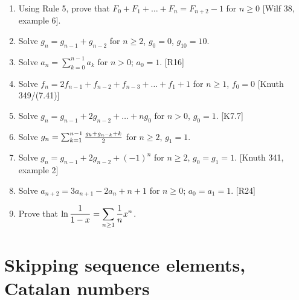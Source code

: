 \documentclass[10pt, a4paper]{article}
\newcommand*\ruleline[1]{\par\noindent\raisebox{.8ex}{\makebox[\linewidth]{\hrulefill\hspace{1ex}\raisebox{-.8ex}{#1}\hspace{1ex}\hrulefill}}}
\def\ans#1{\big[\hskip 2mm {#1}\hskip 2mm\big]}
\begin{document}
\ruleline{Exercises}

\begin{enumerate}
    \item Using Rule 5, prove that $F_0+F_1+\dots+F_n=F_{n+2}-1$ for $n\ge 0$ [Wilf 38, example 6].\\
        \ans{Compare gfs of both sides, left is $f/(1-x)$, where $f = x/(1-x-x^2)$, i.e. Fibonacci.}
    \item Solve $g_n=g_{n-1}+g_{n-2}$ for $n\ge 2$, $g_0 = 0$, $g_{10} = 10$.\\
        \ans{$g_n = {g_{10}\over F_{10}}F_n$, try the ``boundary method'' described above, computer necessary}
    \item Solve $a_n = \sum_{k=0}^{n-1}a_k$ for $n > 0$; $a_0 = 1$. [R16]\\
        \ans{$a_n = 2^{n-1}$ for $n \ge 1$}
    \item Solve $f_n=2f_{n-1}+f_{n-2}+f_{n-3}+\dots+f_1+1$ for $n\ge 1$, $f_0 = 0$ [Knuth 349/(7.41)]\\
        \ans{$F(x) = x/(1-3x+x^2)$; $f_n=F_{2n}$}
    \item Solve $g_n = g_{n-1} + 2g_{n-2}+\dots +ng_0$ for $n> 0$, $g_0 = 1$. [K7.7]\\
        \ans{$G(x)=1+x/(1-3x+x^2)$; $g_n=F_{2n} + [n=0]$}
    \item Solve $g_n = \sum_{k=1}^{n-1} {g_k + g_{n-k} + k\over 2}$ for $n\ge 2$, $g_1 = 1$.
    \item Solve $g_n=g_{n-1}+2g_{n-2}+(-1)^n$ for $n\ge 2$, $g_0 = g_1 = 1$. [Knuth 341, example 2]\\
        \ans{$G(x) = {1+x+x^2\over (1-2x)(1+x)^2}$; $g_n = {7\over 9}2^n + {1\over 9}(3n+2)(-1)^n$}
    \item Solve $a_{n+2}=3a_{n+1}-2a_n+n+1$ for $n\ge 0$; $a_0 = a_1 = 1$. [R24]\\
        \ans{$A(z) = {2\over 1-2z}-{1\over (1-z)^3}$; $a_n = 2^{n+1}-{n+2\choose 2}$}
    \item Prove that $\displaystyle \ln {1\over 1-x} = \sum_{n\ge 1} {1\over n} x^n$. \ans{consider $\int {1\over 1-x}$}
\end{enumerate}


\section{Skipping sequence elements, Catalan numbers}
\end{document}
